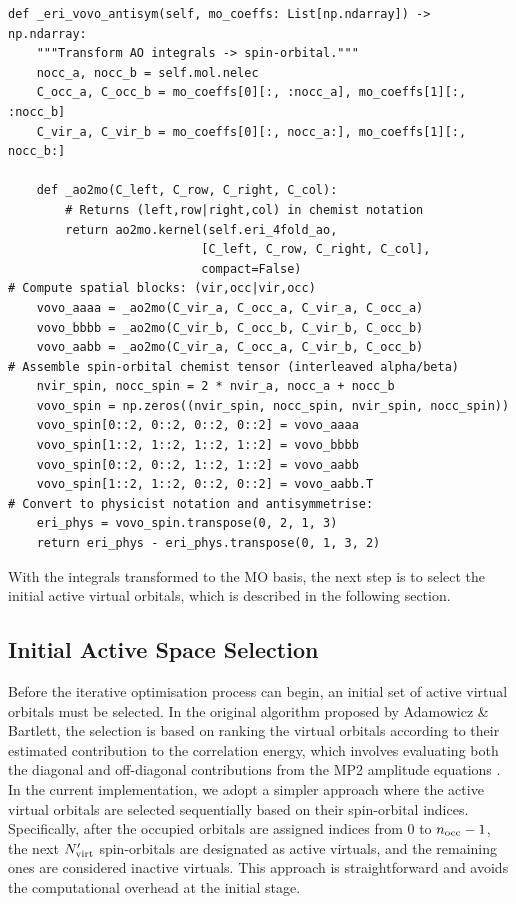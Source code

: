 \begin{lstlisting}[style=python, caption={AO-to-MO integral transformation with spin-orbital antisymmetrisation}, label=lst:integral_transform]
def _eri_vovo_antisym(self, mo_coeffs: List[np.ndarray]) -> np.ndarray:
    """Transform AO integrals -> spin-orbital."""
    nocc_a, nocc_b = self.mol.nelec
    C_occ_a, C_occ_b = mo_coeffs[0][:, :nocc_a], mo_coeffs[1][:, :nocc_b]
    C_vir_a, C_vir_b = mo_coeffs[0][:, nocc_a:], mo_coeffs[1][:, nocc_b:]
    
    def _ao2mo(C_left, C_row, C_right, C_col):
        # Returns (left,row|right,col) in chemist notation
        return ao2mo.kernel(self.eri_4fold_ao,
                           [C_left, C_row, C_right, C_col],
                           compact=False)
# Compute spatial blocks: (vir,occ|vir,occ)
    vovo_aaaa = _ao2mo(C_vir_a, C_occ_a, C_vir_a, C_occ_a)
    vovo_bbbb = _ao2mo(C_vir_b, C_occ_b, C_vir_b, C_occ_b)
    vovo_aabb = _ao2mo(C_vir_a, C_occ_a, C_vir_b, C_occ_b)
# Assemble spin-orbital chemist tensor (interleaved alpha/beta)
    nvir_spin, nocc_spin = 2 * nvir_a, nocc_a + nocc_b
    vovo_spin = np.zeros((nvir_spin, nocc_spin, nvir_spin, nocc_spin))
    vovo_spin[0::2, 0::2, 0::2, 0::2] = vovo_aaaa      
    vovo_spin[1::2, 1::2, 1::2, 1::2] = vovo_bbbb      
    vovo_spin[0::2, 0::2, 1::2, 1::2] = vovo_aabb      
    vovo_spin[1::2, 1::2, 0::2, 0::2] = vovo_aabb.T    
# Convert to physicist notation and antisymmetrise:
    eri_phys = vovo_spin.transpose(0, 2, 1, 3)
    return eri_phys - eri_phys.transpose(0, 1, 3, 2)
\end{lstlisting}

With the integrals transformed to the MO basis, the next step is to select the initial active virtual orbitals, which is described in the following section.


\subsection{Initial Active Space Selection}

Before the iterative optimisation process can begin, an initial set of active virtual orbitals must be selected. In the original algorithm proposed by Adamowicz \& Bartlett, the selection is based on ranking the virtual orbitals according to their estimated contribution to the correlation energy, which involves evaluating both the diagonal and off-diagonal contributions from the MP2 amplitude equations \cite{Adamowicz1987}. In the current implementation, we adopt a simpler approach where the active virtual orbitals are selected sequentially based on their spin-orbital indices. Specifically, after the occupied orbitals are assigned indices from 0 to $n_{\rm occ}-1$, the next $N'_{\rm virt}$ spin-orbitals are designated as active virtuals, and the remaining ones are considered inactive virtuals. This approach is straightforward and avoids the computational overhead at the initial stage.


